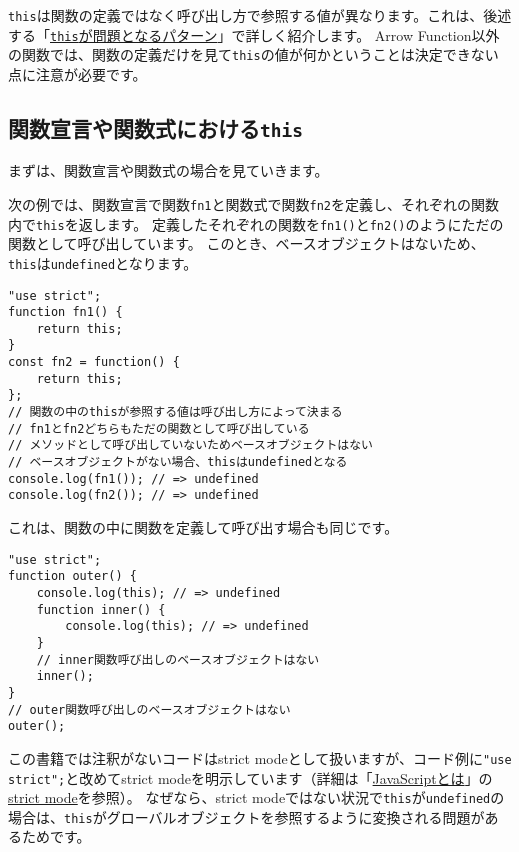\texttt{this}は関数の定義ではなく呼び出し方で参照する値が異なります。これは、後述する「\hyperlink{this-problem}{\texttt{this}が問題となるパターン}」で詳しく紹介します。
Arrow
Function以外の関数では、関数の定義だけを見て\texttt{this}の値が何かということは決定できない点に注意が必要です。

\hypertarget{function-declaration-expression-this}{%
\subsection{\texorpdfstring{関数宣言や関数式における\texttt{this}}{関数宣言や関数式におけるthis}}\label{function-declaration-expression-this}}

まずは、関数宣言や関数式の場合を見ていきます。

次の例では、関数宣言で関数\texttt{fn1}と関数式で関数\texttt{fn2}を定義し、それぞれの関数内で\texttt{this}を返します。
定義したそれぞれの関数を\texttt{fn1()}と\texttt{fn2()}のようにただの関数として呼び出しています。
このとき、ベースオブジェクトはないため、\texttt{this}は\texttt{undefined}となります。

\begin{lstlisting}
"use strict";
function fn1() {
    return this;
}
const fn2 = function() {
    return this;
};
// 関数の中のthisが参照する値は呼び出し方によって決まる
// fn1とfn2どちらもただの関数として呼び出している
// メソッドとして呼び出していないためベースオブジェクトはない
// ベースオブジェクトがない場合、thisはundefinedとなる
console.log(fn1()); // => undefined
console.log(fn2()); // => undefined
\end{lstlisting}

これは、関数の中に関数を定義して呼び出す場合も同じです。

\begin{lstlisting}
"use strict";
function outer() {
    console.log(this); // => undefined
    function inner() {
        console.log(this); // => undefined
    }
    // inner関数呼び出しのベースオブジェクトはない
    inner();
}
// outer関数呼び出しのベースオブジェクトはない
outer();
\end{lstlisting}

この書籍では注釈がないコードはstrict modeとして扱いますが、コード例に\texttt{"use strict";}と改めてstrict modeを明示しています（詳細は「\hyperlink{what-is-javascript}{JavaScriptとは}」の\hyperlink{strict-mode}{strict mode}を参照）。 なぜなら、strict modeではない状況で\texttt{this}が\texttt{undefined}の場合は、\texttt{this}がグローバルオブジェクトを参照するように変換される問題があるためです。

